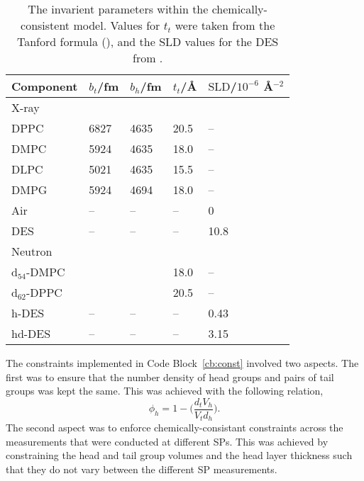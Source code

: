 \begin{table}[b]
    \forceversofloat
    \centering
  \small
    \caption{The invarient parameters within the chemically-consistent model. Values for $t_t$ were taken from the Tanford formula (\cite{tanford_hydrophobic_1980}), and the SLD values for the DES from \cite{sanchez-fernandez_micellization_2016}.}
    \label{tab:invar}
    \begin{tabular}{l | l l l | l}
        \toprule
        Component & $b_t$/\si{\femto\meter} & $b_h$/\si{\femto\meter} & $t_t$/\AA & $\text{SLD}$/$10^{-6}$ \AA$^{-2}$ \\
        \midrule
    X-ray & & & & \\
        DPPC & 6827 & 4635 & 20.5 & -- \\
        DMPC & 5924 & 4635 & 18.0 & -- \\
        DLPC & 5021 & 4635 & 15.5 & -- \\
        DMPG & 5924 & 4694 & 18.0 & -- \\
        Air & -- & -- & -- & 0 \\
        DES & -- & -- & -- & 10.8 \\
        \midrule
        Neutron & & & & \\
        d$_{54}$-DMPC & & & 18.0 & -- \\
        d$_{62}$-DPPC & & & 20.5 & -- \\
        h-DES & -- & -- & -- & 0.43 \\
        hd-DES & -- & -- & -- & 3.15 \\
        \bottomrule
    \end{tabular}
\end{table}
%

The constraints implemented in Code Block~\ref{cb:const} involved two aspects.
The first was to ensure that the number density of head groups and pairs of tail groups was kept the same.
This was achieved with the following relation,\autocite{braun_polymers_2017}
%
\begin{equation}
\phi_h = 1 - \bigg(\frac{d_tV_h}{V_td_h}\bigg).
\label{equ:phih}
\end{equation}
%
The second aspect was to enforce chemically-consistant constraints across the measurements that were conducted at different SPs.
This was achieved by constraining the head and tail group volumes and the head layer thickness such that they do not vary between the different SP measurements.

